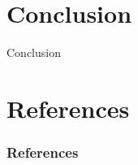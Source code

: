 \documentclass[10pt]{beamer}
\begin{document}
	\section{Conclusion}

	\begin{frame}{Conclusion}
	\end{frame}

	\section{References}

	\begin{frame}
		\frametitle{References}

        \printbibliography
	\end{frame}
\end{document}
